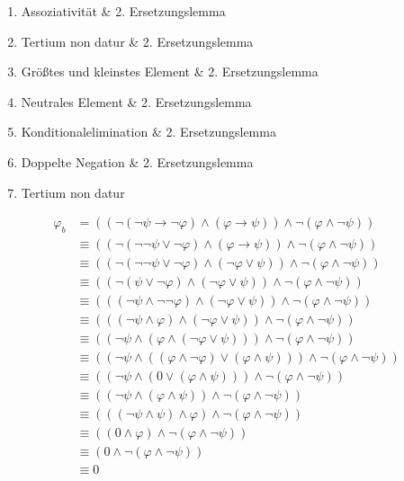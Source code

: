 \documentclass[12pt,a4paper]{scrartcl}
\begin{document}
\begin{enumerate} 
  \item Assoziativität \& 2. Ersetzungslemma
  \item Tertium non datur \& 2. Ersetzungslemma
  \item Größtes und kleinstes Element \& 2. Ersetzungslemma
  \item Neutrales Element \& 2. Ersetzungslemma
  \item Konditionalelimination \& 2. Ersetzungslemma
  \item Doppelte Negation \& 2. Ersetzungslemma
  \item Tertium non datur
\end{enumerate}

\setcounter{equation}{-1}
\begin{align}
  \varphi_b 
    & = ((\neg (\neg \psi \rightarrow \neg \varphi) \wedge (\varphi \rightarrow \psi)) \wedge \neg(\varphi \wedge \neg \psi)) \\
    & \equiv ((\neg (\neg \neg \psi \vee \neg \varphi) \wedge (\varphi \rightarrow \psi)) \wedge \neg(\varphi \wedge \neg \psi)) \\
    & \equiv ((\neg (\neg \neg \psi \vee \neg \varphi) \wedge (\neg \varphi \vee \psi)) \wedge \neg(\varphi \wedge \neg \psi)) \\
    & \equiv ((\neg (\psi \vee \neg \varphi) \wedge (\neg \varphi \vee \psi)) \wedge \neg(\varphi \wedge \neg \psi)) \\
    & \equiv (((\neg \psi \wedge \neg \neg \varphi) \wedge (\neg \varphi \vee \psi)) \wedge \neg(\varphi \wedge \neg \psi)) \\
    & \equiv (((\neg \psi \wedge \varphi) \wedge (\neg \varphi \vee \psi)) \wedge \neg(\varphi \wedge \neg \psi)) \\
    & \equiv ((\neg \psi \wedge (\varphi \wedge (\neg \varphi \vee \psi))) \wedge \neg(\varphi \wedge \neg \psi)) \\
    & \equiv ((\neg \psi \wedge ((\varphi \wedge \neg \varphi) \vee (\varphi \wedge \psi))) \wedge \neg(\varphi \wedge \neg \psi)) \\
    & \equiv ((\neg \psi \wedge (0 \vee (\varphi \wedge \psi))) \wedge \neg(\varphi \wedge \neg \psi)) \\
    & \equiv ((\neg \psi \wedge (\varphi \wedge \psi)) \wedge \neg(\varphi \wedge \neg \psi)) \\
    & \equiv (((\neg \psi \wedge \psi) \wedge \varphi) \wedge \neg(\varphi \wedge \neg \psi)) \\
    & \equiv ((0 \wedge \varphi) \wedge \neg(\varphi \wedge \neg \psi)) \\
    & \equiv (0 \wedge \neg(\varphi \wedge \neg \psi)) \\
    & \equiv 0
\end{align}
\end{document}
